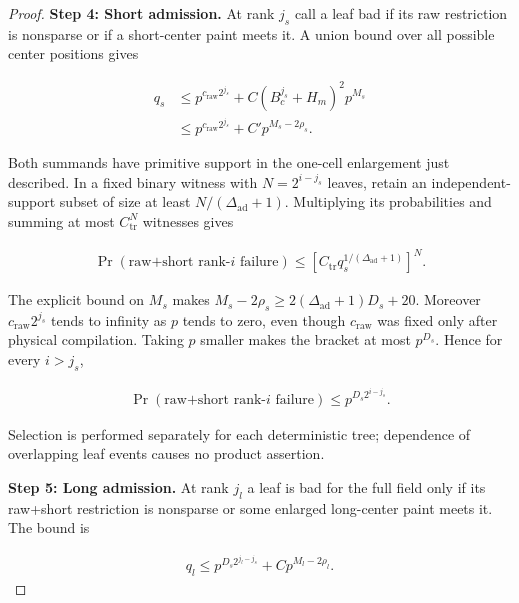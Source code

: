 \begin{proof}
\smallskip\noindent\textbf{Step 4: Short admission.} At rank \(j_{s}\) call a leaf bad if its raw restriction is nonsparse or if a short-center paint meets it. A union bound over all possible center positions gives


\begin{equation}\label{q1:e12.3}
\begin{aligned}
q_{s} &\le p^{c_{\mathrm{raw}} 2^{j_{s}}} + C (B_{c}^{j_{s}}+H_{m})^{2} p^{M_{s}}\\
&\le p^{c_{\mathrm{raw}} 2^{j_{s}}} + C' p^{M_{s}-2\rho_{s}}.
\end{aligned}
\end{equation}

Both summands have primitive support in the one-cell enlargement just described. In a fixed binary witness with \(N=2^{i-j_{s}}\) leaves, retain an independent-support subset of size at least \(N/(\Delta_{\mathrm{ad}}+1)\). Multiplying its probabilities and summing at most \(C_{\mathrm{tr}}^{N}\) witnesses gives

\[
\begin{gathered}
\Pr(\text{raw+short rank-}i\text{ failure}) \le  [C_{\mathrm{tr}} q_{s}^{1/(\Delta_{\mathrm{ad}}+1)}]^{N}.
\end{gathered}
\]

The explicit bound on \(M_{s}\) makes \(M_{s}-2\rho_{s}\ge 2(\Delta_{\mathrm{ad}}+1)D_{s}+20\). Moreover \(c_{\mathrm{raw}} 2^{j_{s}}\) tends to infinity as \(p\) tends to zero, even though \(c_{\mathrm{raw}}\) was fixed only after physical compilation. Taking \(p\) smaller makes the bracket at most \(p^{D_{s}}\). Hence for every \(i>j_{s}\),

\begin{equation}\label{q1:e12.4}
\begin{gathered}
\Pr(\text{raw+short rank-}i\text{ failure}) \le  p^{D_{s} 2^{i-j_{s}}}.
\end{gathered}
\end{equation}

Selection is performed separately for each deterministic tree; dependence of overlapping leaf events causes no product assertion.

\smallskip\noindent\textbf{Step 5: Long admission.} At rank \(j_{l}\) a leaf is bad for the full field only if its raw+short restriction is nonsparse or some enlarged long-center paint meets it. The bound is


\begin{equation}\label{q1:e12.5}
\begin{gathered}
q_{l} \le  p^{D_{s} 2^{j_{l}-j_{s}}} + C p^{M_{l}-2\rho_{l}}.
\end{gathered}
\end{equation}


\end{proof}
